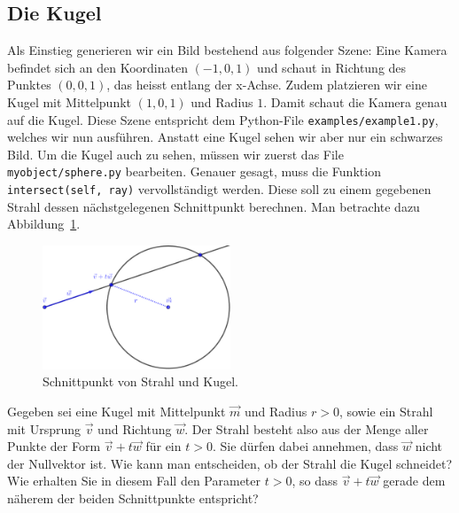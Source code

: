 \subsection{Die Kugel}
Als Einstieg generieren wir ein Bild bestehend aus folgender Szene:
Eine Kamera befindet sich an den Koordinaten $(-1,0,1)$ und schaut in Richtung des Punktes $(0,0,1)$, das heisst entlang der x-Achse.
Zudem platzieren wir eine Kugel mit Mittelpunkt $(1,0,1)$ und Radius $1$.
Damit schaut die Kamera genau auf die Kugel.
Diese Szene entspricht dem Python-File \texttt{examples/example1.py}, welches wir nun ausführen. Anstatt eine Kugel sehen wir aber nur ein schwarzes Bild.
Um die Kugel auch zu sehen, müssen wir zuerst das File \texttt{myobject/sphere.py} bearbeiten.
Genauer gesagt, muss die Funktion \texttt{intersect(self, ray)} vervollständigt werden.
Diese soll zu einem gegebenen Strahl dessen nächstgelegenen Schnittpunkt berechnen.
Man betrachte dazu Abbildung~\ref{fig:sphere_intersect}.
\begin{figure}[ht]
	\centering
	\includegraphics[width=0.5\textwidth]{images/sphere_intersect.pdf}
	\caption{Schnittpunkt von Strahl und Kugel.}
	\label{fig:sphere_intersect}
\end{figure}
\begin{aufgabe}\label{aufg:intersect_theory}
	Gegeben sei eine Kugel mit Mittelpunkt $\vec{m}$ und Radius $r>0$, sowie ein Strahl mit Ursprung $\vec{v}$ und Richtung $\vec{w}$.
	Der Strahl besteht also aus der Menge aller Punkte der Form $\vec{v}+t\vec{w}$ für ein $t>0$.
	Sie dürfen dabei annehmen, dass $\vec{w}$ nicht der Nullvektor ist.
	Wie kann man entscheiden, ob der Strahl die Kugel schneidet?
	Wie erhalten Sie in diesem Fall den Parameter $t>0$, so dass $\vec{v}+t\vec{w}$ gerade dem näherem der beiden Schnittpunkte entspricht?
\end{aufgabe}
